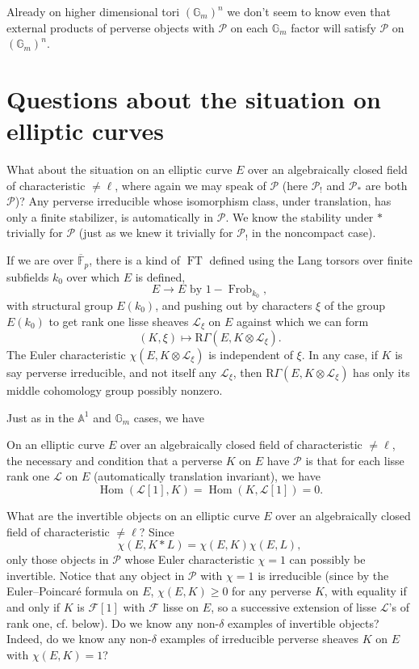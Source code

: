 Already on higher dimensional tori \((\mathbb{G}_m)^n\) we don't seem to know
even that external products of perverse objects with \(\mathcal{P}\) on each
\(\mathbb{G}_m\) factor will satisfy \(\mathcal{P}\) on \((\mathbb{G}_m)^n\).

\section{Questions about the situation on elliptic curves}\label{sec:2.16}

What about the situation on an elliptic curve \(E\) over an algebraically
closed field of characteristic \(\ne\ell\), where again we may speak of
\(\mathcal{P}\) (here \(\mathcal{P}_!\) and \(\mathcal{P}_*\) are both
\(\mathcal{P}\))? Any perverse irreducible whose isomorphism class, under
translation, has only a finite stabilizer, is automatically in
\(\mathcal{P}\). We know the stability under \(*\) trivially for
\(\mathcal{P}\) (just as we knew it trivially for \(\mathcal{P}_!\) in the
noncompact case).

If we are over \(\overline{\mathbb{F}}_p\), there is a kind of
\(\operatorname{FT}\) defined using the Lang torsors over finite subfields
\(k_0\) over which \(E\) is defined,
\[
  E\to E\text{ by }1-\operatorname{Frob}_{k_0},
\]
with structural group \(E(k_0)\), and pushing out by characters \(\xi\) of the
group \(E(k_0)\) to get rank one lisse sheaves \(\mathcal{L}_\xi\) on \(E\)
against which we can form
\[
  (K,\xi)\mapsto \mathrm{R}\Gamma(E,K\otimes\mathcal{L}_\xi).
\]
The Euler characteristic \(\chi(E,K\otimes\mathcal{L}_\xi)\) is independent of
\(\xi\). In any case, if \(K\) is say perverse irreducible, and not itself any
\(\mathcal{L}_\xi\), then
\(\mathrm{R}\Gamma(E,K\otimes\mathcal{L}_\xi)\) has only its middle cohomology
group possibly nonzero.

Just as in the \(\mathbb{A}^1\) and \(\mathbb{G}_m\) cases, we have

On an elliptic curve \(E\) over an algebraically closed field of characteristic
\(\ne\ell\), the necessary and condition that a perverse \(K\) on \(E\) have
\(\mathcal{P}\) is that for each lisse rank one \(\mathcal{L}\) on \(E\)
(automatically translation invariant), we have
\[
  \operatorname{Hom}(\mathcal{L}[1],K)=\operatorname{Hom}(K,\mathcal{L}[1])=0.
\]

What are the invertible objects on an elliptic curve \(E\) over an
algebraically closed field of characteristic \(\ne\ell\)? Since
\[
  \chi(E,K*L)=\chi(E,K)\chi(E,L),
\]
only those objects in \(\mathcal{P}\) whose Euler characteristic \(\chi=1\)
can possibly be invertible. Notice that any object in \(\mathcal{P}\) with
\(\chi=1\) is irreducible (since by the Euler--Poincaré formula on \(E\),
\(\chi(E,K)\geq0\) for any perverse \(K\), with equality if and only if \(K\)
is \(\mathcal{F}[1]\) with \(\mathcal{F}\) lisse on \(E\), so a successive
extension of lisse \(\mathcal{L}\)'s of rank one, cf. below). Do we know any
non-\(\delta\) examples of invertible objects? Indeed, do we know any
non-\(\delta\) examples of irreducible perverse sheaves \(K\) on \(E\) with
\(\chi(E,K)=1\)?

